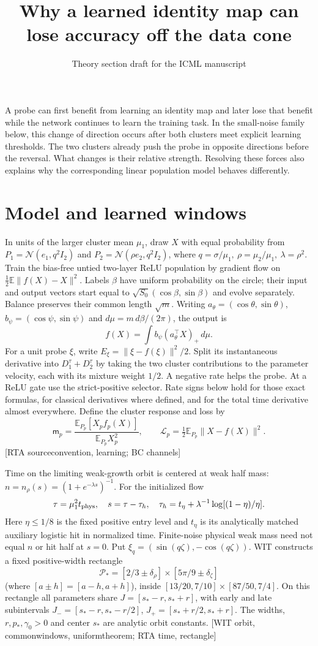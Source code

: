 \documentclass[10pt,twocolumn]{article}
\title{Why a learned identity map can lose accuracy off the data cone}
\author{Theory section draft for the ICML manuscript}
\date{}
\newcommand{\E}{\mathbb E}\newcommand{\dd}{\,d}
\newcommand{\src}[1]{\textnormal{\small [#1]}}
\begin{document}
\maketitle
A probe can first benefit from learning an identity map and later lose
that benefit while the network continues to learn the training task.
In the small-noise family below, this change of direction occurs after
both clusters meet explicit learning thresholds. The two clusters
already push the probe in opposite directions before the reversal.
What changes is their relative strength. Resolving these forces also
explains why the corresponding linear population model behaves differently.

\section{Model and learned windows}\label{p1thv1:model}
In units of the larger cluster mean \(\mu_1\), draw \(X\) with equal
probability from \(P_1=\mathcal N(e_1,q^2I_2)\) and
\(P_2=\mathcal N(\rho e_2,q^2I_2)\), where
\(q=\sigma/\mu_1,\ \rho=\mu_2/\mu_1,\ \lambda=\rho^2\).
Train the bias-free untied two-layer ReLU population by gradient flow
on \(\tfrac12\E\|f(X)-X\|^2\). Labels \(\beta\) have uniform
probability on the circle; their input and output vectors start equal
to \(\sqrt{S_0}(\cos\beta,\sin\beta)\) and evolve separately. Balance
preserves their common length \(\sqrt m\). Writing
\(a_\theta=(\cos\theta,\sin\theta)\), \(b_\psi=(\cos\psi,\sin\psi)\)
and \(d\mu=m\,d\beta/(2\pi)\), the output is
\[
 f(X)=\int b_\psi(a_\theta^\top X)_+\,d\mu .
\]
For a unit probe \(\xi\), write \(E_\xi=\|\xi-f(\xi)\|^2/2\).
Split its instantaneous derivative into \(D_1^\tau+D_2^\tau\)
by taking the two cluster contributions to the parameter velocity,
each with its mixture weight \(1/2\). A negative rate helps the probe.
At a ReLU gate use the strict-positive selector. Rate signs below
hold for those exact formulas, for classical derivatives where defined,
and for the total time derivative almost everywhere. Define the cluster
response and loss by
\[
 \mathsf m_p=\frac{\E_{P_p}[X_pf_p(X)]}{\E_{P_p}X_p^2},\qquad
 \mathcal L_p=\tfrac12\E_{P_p}\|X-f(X)\|^2 .
\]
\src{RTA sourceconvention, learning; BC channels}

Time on the limiting weak-growth orbit is centered at weak half mass:
\(n=n_\rho(s)=(1+e^{-\lambda s})^{-1}\). For the initialized flow
\[
 \tau=\mu_1^2 t_{\rm phys},\quad s=\tau-\tau_h,\quad
 \tau_h=t_\eta+\lambda^{-1}\log[(1-\eta)/\eta].
\]
Here \(\eta\le1/8\) is the fixed positive entry level and \(t_\eta\)
is its analytically matched auxiliary logistic hit in normalized time.
Finite-noise physical weak mass need not equal \(n\) or hit half at
\(s=0\). Put \(\xi_q=(\sin(q\zeta),-\cos(q\zeta))\). WIT constructs
a fixed positive-width rectangle
\[
 \mathcal P_*=[2/3\pm\delta_\rho]\times[5\pi/9\pm\delta_\zeta]
\]
(where \([a\pm h]=[a-h,a+h]\)), inside
\([13/20,7/10]\times[87/50,7/4]\). On this rectangle all parameters
share \(J=[s_*-r,s_*+r]\), with early and late subintervals
\(J_-=[s_*-r,s_*-r/2]\), \(J_+=[s_*+r/2,s_*+r]\).
The widths, \(r,p_*,\gamma_0>0\) and center \(s_*\) are analytic
orbit constants. \src{WIT orbit, commonwindows, uniformtheorem;
RTA time, rectangle}
\end{document}
